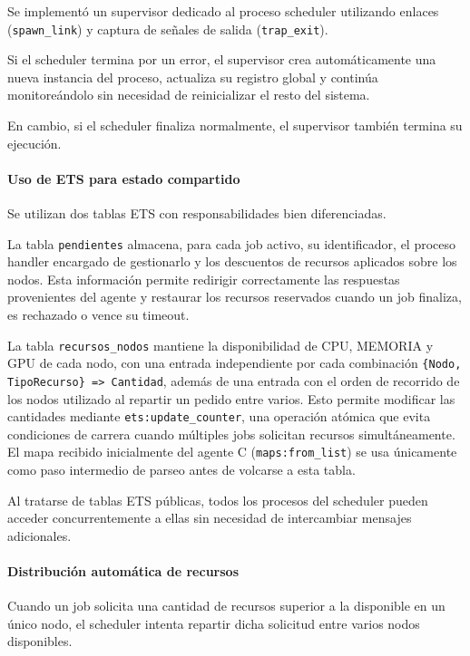 \documentclass[a4paper,10pt]{article}
\begin{document}
Se implementó un supervisor dedicado al proceso scheduler utilizando enlaces (\texttt{spawn\_link}) y captura de señales de salida (\texttt{trap\_exit}).

\noindent Si el scheduler termina por un error, el supervisor crea automáticamente una nueva instancia del proceso, actualiza su registro global y continúa monitoreándolo sin necesidad de reinicializar el resto del sistema.

\noindent En cambio, si el scheduler finaliza normalmente, el supervisor también termina su ejecución.

\paragraph{Uso de ETS para estado compartido}

Se utilizan dos tablas ETS con responsabilidades bien diferenciadas.

\noindent La tabla \texttt{pendientes} almacena, para cada job activo, su identificador,
el proceso handler encargado de gestionarlo y los descuentos de recursos
aplicados sobre los nodos. Esta información permite redirigir correctamente
las respuestas provenientes del agente y restaurar los recursos reservados
cuando un job finaliza, es rechazado o vence su timeout.

\noindent La tabla \texttt{recursos\_nodos} mantiene la disponibilidad de CPU, MEMORIA
y GPU de cada nodo, con una entrada independiente por cada combinación
\texttt{\{Nodo, TipoRecurso\} => Cantidad}, además de una entrada con el
orden de recorrido de los nodos utilizado al repartir un pedido entre varios.
Esto permite modificar las cantidades mediante \texttt{ets:update\_counter},
una operación atómica que evita condiciones de carrera cuando múltiples jobs
solicitan recursos simultáneamente. El mapa recibido inicialmente del agente
C (\texttt{maps:from\_list}) se usa únicamente como paso intermedio de
parseo antes de volcarse a esta tabla.

\noindent Al tratarse de tablas ETS públicas, todos los procesos del scheduler pueden
acceder concurrentemente a ellas sin necesidad de intercambiar mensajes
adicionales.

\paragraph{Distribución automática de recursos}

Cuando un job solicita una cantidad de recursos superior a la disponible en un único nodo, el scheduler intenta repartir dicha solicitud entre varios nodos disponibles.
\end{document}
